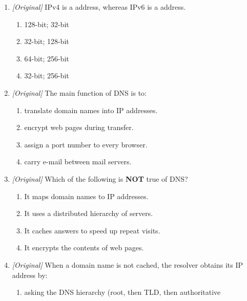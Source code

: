 \documentclass[11pt]{article}
\begin{document}
\begin{enumerate}[label=\textbf{Q\arabic*.}, leftmargin=*]
\begin{enumerate}[label=\Alph*.]
      the host part inside it.
    \item A domain name is the full address of one resource; the URL is only
      the host part inside it.
    \item A URL and a domain name are identical in every part.
    \item A URL names the server hardware; a domain name names the page
      content.
  \end{enumerate}
\item \textit{[Original]} IPv4 is a \underline{\hspace{1.2cm}} address,
  whereas IPv6 is a \underline{\hspace{1.2cm}} address.
  \begin{enumerate}[label=\Alph*.]
    \item 128-bit; 32-bit
    \item 32-bit; 128-bit
    \item 64-bit; 256-bit
    \item 32-bit; 256-bit
  \end{enumerate}
\item \textit{[Original]} The main function of DNS is to:
  \begin{enumerate}[label=\Alph*.]
    \item translate domain names into IP addresses.
    \item encrypt web pages during transfer.
    \item assign a port number to every browser.
    \item carry e-mail between mail servers.
  \end{enumerate}
\item \textit{[Original]} Which of the following is \textbf{NOT} true of DNS?
  \begin{enumerate}[label=\Alph*.]
    \item It maps domain names to IP addresses.
    \item It uses a distributed hierarchy of servers.
    \item It caches answers to speed up repeat visits.
    \item It encrypts the contents of web pages.
  \end{enumerate}
\item \textit{[Original]} When a domain name is not cached, the resolver
  obtains its IP address by:
  \begin{enumerate}[label=\Alph*.]
    \item asking the DNS hierarchy (root, then TLD, then authoritative

\end{enumerate}
\end{enumerate}
\end{document}
